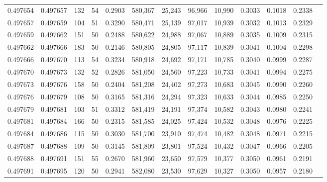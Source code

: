 \begin{tabular}{rrrrrrrrrrrrr}
0.497654 & 0.497657 &   132 &  54 &                                     0.2903 & 580,367 &  25,243 &  96,966 &  10,990 & 0.3033 & 0.1018 & 0.2338 \\
0.497657 & 0.497659 &   104 &  51 &                                     0.3290 & 580,471 &  25,139 &  97,017 &  10,939 & 0.3032 & 0.1013 & 0.2329 \\
0.497659 & 0.497662 &   151 &  50 &                                     0.2488 & 580,622 &  24,988 &  97,067 &  10,889 & 0.3035 & 0.1009 & 0.2315 \\
0.497662 & 0.497666 &   183 &  50 &                                     0.2146 & 580,805 &  24,805 &  97,117 &  10,839 & 0.3041 & 0.1004 & 0.2298 \\
0.497666 & 0.497670 &   113 &  54 &                                     0.3234 & 580,918 &  24,692 &  97,171 &  10,785 & 0.3040 & 0.0999 & 0.2287 \\
0.497670 & 0.497673 &   132 &  52 &                                     0.2826 & 581,050 &  24,560 &  97,223 &  10,733 & 0.3041 & 0.0994 & 0.2275 \\
0.497673 & 0.497676 &   158 &  50 &                                     0.2404 & 581,208 &  24,402 &  97,273 &  10,683 & 0.3045 & 0.0990 & 0.2260 \\
0.497676 & 0.497679 &   108 &  50 &                                     0.3165 & 581,316 &  24,294 &  97,323 &  10,633 & 0.3044 & 0.0985 & 0.2250 \\
0.497679 & 0.497681 &   103 &  51 &                                     0.3312 & 581,419 &  24,191 &  97,374 &  10,582 & 0.3043 & 0.0980 & 0.2241 \\
0.497681 & 0.497684 &   166 &  50 &                                     0.2315 & 581,585 &  24,025 &  97,424 &  10,532 & 0.3048 & 0.0976 & 0.2225 \\
0.497684 & 0.497686 &   115 &  50 &                                     0.3030 & 581,700 &  23,910 &  97,474 &  10,482 & 0.3048 & 0.0971 & 0.2215 \\
0.497687 & 0.497688 &   109 &  50 &                                     0.3145 & 581,809 &  23,801 &  97,524 &  10,432 & 0.3047 & 0.0966 & 0.2205 \\
0.497688 & 0.497691 &   151 &  55 &                                     0.2670 & 581,960 &  23,650 &  97,579 &  10,377 & 0.3050 & 0.0961 & 0.2191 \\
0.497691 & 0.497695 &   120 &  50 &                                     0.2941 & 582,080 &  23,530 &  97,629 &  10,327 & 0.3050 & 0.0957 & 0.2180 \\

\end{tabular}
